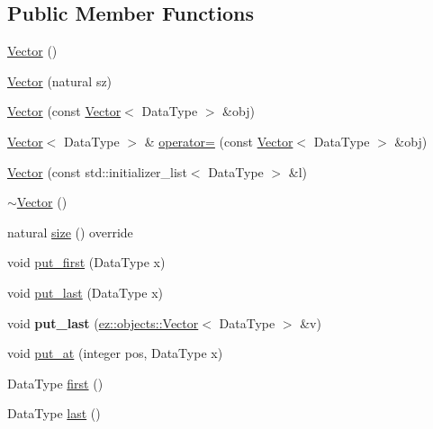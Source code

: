 \subsection*{Public Member Functions}
\begin{DoxyCompactItemize}
\item 
\hyperlink{classez_1_1objects_1_1Vector_aa038e392499b2feed97b02a56ca949c1}{Vector} ()
\item 
\hyperlink{classez_1_1objects_1_1Vector_a5eb6b99b1017a86ef85edc6a205295ea}{Vector} (natural sz)
\item 
\hyperlink{classez_1_1objects_1_1Vector_a04cb74d7bc97e5c752891d88ad1044b0}{Vector} (const \hyperlink{classez_1_1objects_1_1Vector}{Vector}$<$ Data\+Type $>$ \&obj)
\item 
\hyperlink{classez_1_1objects_1_1Vector}{Vector}$<$ Data\+Type $>$ \& \hyperlink{classez_1_1objects_1_1Vector_a26bb7742a22ce16d505feb5084e3a31c}{operator=} (const \hyperlink{classez_1_1objects_1_1Vector}{Vector}$<$ Data\+Type $>$ \&obj)
\item 
\hyperlink{classez_1_1objects_1_1Vector_a76477cc76b16c89b59478ca1b1cd7f7e}{Vector} (const std\+::initializer\+\_\+list$<$ Data\+Type $>$ \&l)
\item 
\hyperlink{classez_1_1objects_1_1Vector_a71fe918da47724d508de0875b6bc5fdd}{$\sim$\+Vector} ()
\item 
natural \hyperlink{classez_1_1objects_1_1Vector_a0c9401b7eb53dc1bff3becb8d87e5a90}{size} () override
\item 
void \hyperlink{classez_1_1objects_1_1Vector_a126fc8c7cff41e8b2a4f3dda84431687}{put\+\_\+first} (Data\+Type x)
\item 
void \hyperlink{classez_1_1objects_1_1Vector_a618cef3efe3117c70c6838dee95edc2b}{put\+\_\+last} (Data\+Type x)
\item 
\mbox{\label{classez_1_1objects_1_1Vector_ac12ab6f98c20025825ed668db349e858}} 
void {\bfseries put\+\_\+last} (\hyperlink{classez_1_1objects_1_1Vector}{ez\+::objects\+::\+Vector}$<$ Data\+Type $>$ \&v)
\item 
void \hyperlink{classez_1_1objects_1_1Vector_a660269dc0dd23fc3d59bb9b50093396b}{put\+\_\+at} (integer pos, Data\+Type x)
\item 
Data\+Type \hyperlink{classez_1_1objects_1_1Vector_aa83f2702c3d95a1b03842b113b36ecbf}{first} ()
\item 
Data\+Type \hyperlink{classez_1_1objects_1_1Vector_a548b8f584d5272d19f267ea5585ad305}{last} ()

\end{DoxyCompactItemize}

